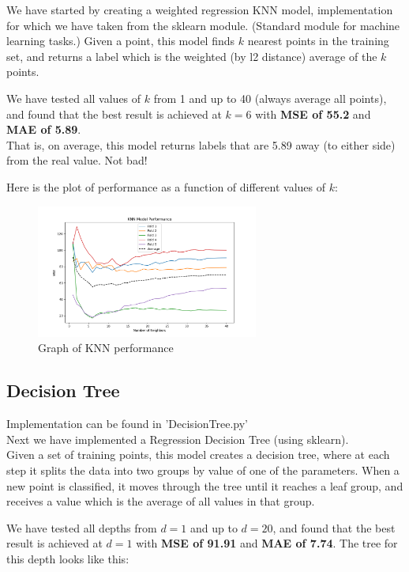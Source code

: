 \documentclass[11pt, oneside]{article}   	%
\begin{document}
We have started by creating a weighted regression KNN model, implementation for which we have taken from the sklearn module. (Standard module for machine learning tasks.)
Given a point, this model finds $k$ nearest points in the training set, and returns a label which is the weighted (by l2 distance) average of the $k$ points.

We have tested all values of $k$ from 1 and up to 40 (always average all points), and found that the best result is achieved at $k=6$ with \textbf{MSE of 55.2} and \textbf{MAE of 5.89}.\\
That is, on average, this model returns labels that are 5.89 away (to either side) from the real value. Not bad!

Here is the plot of performance as a function of different values of $k$:
\begin{figure}[H]
\begin{center}
    \includegraphics[width=0.65\textwidth]{../plots/knn_performance.png}
    \caption{Graph of KNN performance}
\end{center}
\end{figure}

\subsection{Decision Tree}
Implementation can be found in 'DecisionTree.py'\\

Next we have implemented a Regression Decision Tree (using sklearn).\\
Given a set of training points, this model creates a decision tree, where at each step it splits the data into two groups by value of one of the parameters. When a new point is classified, it moves through the tree until it reaches a leaf group, and receives a value which is the average of all values in that group.

We have tested all depths from $d=1$ and up to $d=20$, and found that the best result is achieved at $d=1$ with \textbf{MSE of 91.91} and \textbf{MAE of 7.74}. The tree for this depth looks like this:
\end{document}
